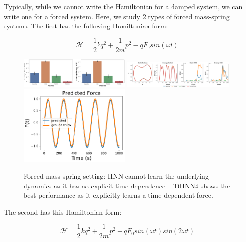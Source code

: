 \documentclass[twoside]{article}
\begin{document}
Typically, while we cannot write the Hamiltonian for a damped system, we can write one for a forced system. Here, we study 2 types of forced mass-spring systems. The first has the following Hamiltonian form:

\begin{equation}
\mathcal{H} = \frac{1}{2}kq^2 + \frac{1}{2m}p^2 - qF_0sin(\omega t) 
\end{equation}

\begin{figure}[h!]
\centering
\includegraphics[width=0.49\textwidth]{figures/mass_spring_forced_1_errors.pdf}
\includegraphics[width=0.49\textwidth]{figures/mass_spring_forced_1_pred.pdf}
\includegraphics[width=0.49\textwidth]{figures/TDHNN4_mass_spring_force_1.pdf}
\caption{Forced mass spring setting: HNN cannot learn the underlying dynamics as it has no explicit-time dependence. TDHNN4 shows the best performance as it explicitly learns a time-dependent force.}
\end{figure}

The second has this Hamiltonian form:

\begin{equation}
\mathcal{H} = \frac{1}{2}kq^2 + \frac{1}{2m}p^2 - qF_0sin(\omega t)sin(2\omega t)
\end{equation}
\end{document}

